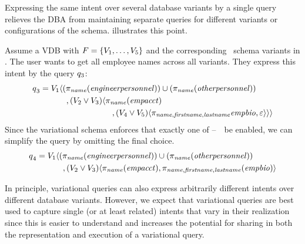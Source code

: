 Expressing
the same intent over several database variants by a single query relieves the DBA from
maintaining separate queries for different variants or configurations of the
schema.
illustrates this point.

\begin{example}
\label{eg:vq-same-intent-mult-vars}
Assume a VDB with  \ensuremath{\features = \setDef{\vOne, \ldots, \vFive}}
and the corresponding \basic\ schema
variants in . The user wants to get all employee names across all
variants. They express this intent by the query $\vQ_3$:
%
\begin{align*}
\vQ_3 &= 
  \vOne\chcL
    (\pi_{\name}(\engemp)) \cup (\pi_{\name}(\othemp)) \\
 & \hspace{32pt},
    (\vTwo\vee\vThree)\chcL
      \pi_{\name}(\empacct) \\
 & \hspace{88pt},
      \chc[(\vFour\vee\vFive)]{\pi_{\name,\fname,\lname}\empbio, \emp}\chcR\chcR
\end{align*}
%
Since the variational schema enforces that exactly one of \vOne--\ \vFive\ be enabled, we
can simplify the query by omitting the final choice.
%
\begin{align*}
\vQ_4 &= 
  \vOne\chcL
    (\pi_{\name}(\engemp)) \cup (\pi_{\name}(\othemp)) \\
 & \hspace{32pt},
    \chc[(\vTwo\vee\vThree)]{
      \pi_{\name}(\empacct),
      \pi_{\name,\fname,\lname}(\empbio)}
\end{align*}
%
\end{example}

In principle, variational queries can also express arbitrarily different intents over
different database variants. However, we expect that variational queries are best used to
capture single (or at least related) intents that vary in their realization
since this is easier to understand and increases the potential for sharing in
both the representation and execution of a variational query.






